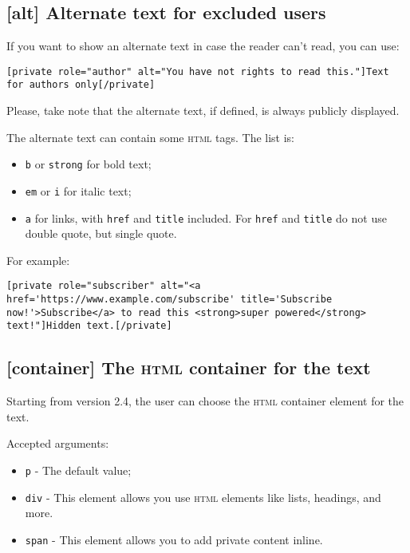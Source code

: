 \documentclass[
	titlepage,
	headinclude,
	abstract=on,
	paper=a4,
	fontsize=11pt,
]{scrartcl}
\begin{document}
\subsection{[alt] Alternate text for excluded users}

If you want to show an alternate text in case the reader can't read, you can use:

\begin{lstlisting}
[private role="author" alt="You have not rights to read this."]Text for authors only[/private]
\end{lstlisting}

Please, take note that the alternate text, if defined, is always publicly displayed.

The alternate text can contain some \textsc{html} tags. The list is:

\begin{itemize}
 \item \verb+b+ or \verb+strong+ for bold text;
 \item \verb+em+ or \verb+i+ for italic text;
 \item \verb+a+ for links, with \verb+href+ and \verb+title+ included. For \verb+href+ and \verb+title+ do not use double quote, but single quote.
\end{itemize}

For example:

\begin{lstlisting}
[private role="subscriber" alt="<a href='https://www.example.com/subscribe' title='Subscribe now!'>Subscribe</a> to read this <strong>super powered</strong> text!"]Hidden text.[/private]
\end{lstlisting}

\subsection{[container] The \textsc{html} container for the text}

Starting from version 2.4, the user can choose the \textsc{html} container element for the text.

Accepted arguments:

\begin{itemize}
 \item \verb+p+ - The default value;
 \item \verb+div+ - This element allows you use \textsc{html} elements like lists, headings, and more.
 \item \verb+span+ - This element allows you to add private content inline.
\end{itemize}
\end{document}

